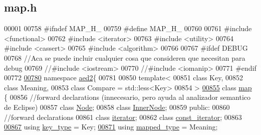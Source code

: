 \hypertarget{map_8h_source}{}\subsection{map.\+h}

\begin{DoxyCode}
00001 
00758 \textcolor{preprocessor}{#ifndef MAP\_H\_}
00759 \textcolor{preprocessor}{#define MAP\_H\_}
00760 
00761 \textcolor{preprocessor}{#include <functional>}
00762 \textcolor{preprocessor}{#include <iterator>}
00763 \textcolor{preprocessor}{#include <utility>}
00764 \textcolor{preprocessor}{#include <cassert>}
00765 \textcolor{preprocessor}{#include <algorithm>}
00766 
00767 \textcolor{preprocessor}{#ifdef DEBUG}
00768 \textcolor{comment}{//Aca se puede incluir cualquier cosa que consideren que necesitan para debug}
00769 \textcolor{comment}{//#include <iostream>}
00770 \textcolor{comment}{//#include <iomanip>}
00771 \textcolor{preprocessor}{#endif}
00772 
\hypertarget{map_8h_source.tex_l00780}{}\hyperlink{namespaceaed2}{00780} \textcolor{keyword}{namespace }\hyperlink{namespaceaed2}{aed2}\{
00781 
00850 \textcolor{keyword}{template}<
00851   \textcolor{keyword}{class }Key,
00852   \textcolor{keyword}{class }Meaning,
00853   \textcolor{keyword}{class }Compare = std::less<Key>
00854 >
\hypertarget{map_8h_source.tex_l00855}{}\hyperlink{classaed2_1_1map}{00855} \textcolor{keyword}{class }\hyperlink{classaed2_1_1map}{map} \{
00856     \textcolor{comment}{//forward declarations (innecesario, pero ayuda al analizador semantico de Eclipse)}
00857     \textcolor{keyword}{class }\hyperlink{structaed2_1_1map_1_1Node}{Node};
00858     \textcolor{keyword}{class }\hyperlink{structaed2_1_1map_1_1InnerNode}{InnerNode};
00859 \textcolor{keyword}{public}:
00860     \textcolor{comment}{//forward declarations}
00861     \textcolor{keyword}{class }\hyperlink{classaed2_1_1map_1_1iterator}{iterator};
00862     \textcolor{keyword}{class }\hyperlink{classaed2_1_1map_1_1const__iterator}{const\_iterator};
00863 
\hypertarget{map_8h_source.tex_l00867}{}\hyperlink{classaed2_1_1map_a4273e8812e7105a618df58a2c8b72b7d_a4273e8812e7105a618df58a2c8b72b7d}{00867}     \textcolor{keyword}{using} \hyperlink{classaed2_1_1map_a4273e8812e7105a618df58a2c8b72b7d_a4273e8812e7105a618df58a2c8b72b7d}{key\_type} = Key;
\hypertarget{map_8h_source.tex_l00871}{}\hyperlink{classaed2_1_1map_aa3e34bf624f3009884a71b18f4ddae40_aa3e34bf624f3009884a71b18f4ddae40}{00871}     \textcolor{keyword}{using} \hyperlink{classaed2_1_1map_aa3e34bf624f3009884a71b18f4ddae40_aa3e34bf624f3009884a71b18f4ddae40}{mapped\_type} = Meaning;

\end{DoxyCode}
